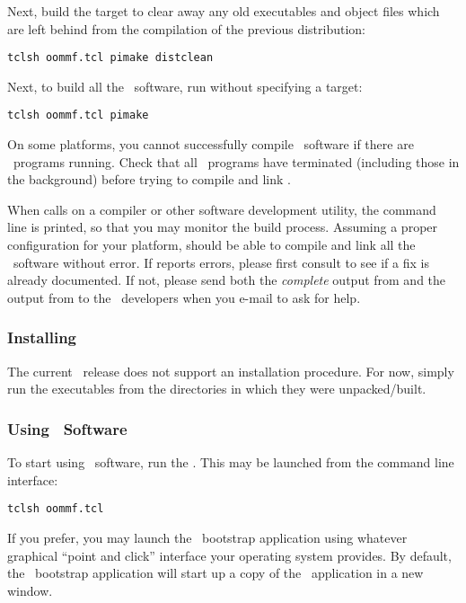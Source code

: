 Next, build the target  to clear away any old executables
and object files which are left behind from the compilation of the
previous distribution:
\begin{verbatim}
tclsh oommf.tcl pimake distclean
\end{verbatim}

Next, to build all the \OOMMF\ software, run  without
specifying a target:
\begin{verbatim}
tclsh oommf.tcl pimake
\end{verbatim}
On some platforms, you cannot successfully compile \OOMMF\ software if
there are \OOMMF\ programs running.  Check that all \OOMMF\ programs
have terminated (including those in the background) before trying to
compile and link \OOMMF.

When  calls on a compiler or other software development
utility, the command line is printed, so that you may monitor the build
process.  
Assuming a proper configuration for your platform,  should be
able to compile and link all the \OOMMF\ software without error.  If
 reports errors, please first consult 
to see if a fix is already documented.
If not, please send both the {\em complete} output 
from  and the output from 
to the \OOMMF\ developers when you e-mail to ask for help.

\subsubsection{Installing}

The current \OOMMF\ release does not support an installation procedure.
For now, simply run the executables from the directories in which they
were unpacked/built.

\subsubsection{Using \OOMMF\ Software}

To start using \OOMMF\ software, run the 
. This may be launched from the command
line interface:
\begin{verbatim}
tclsh oommf.tcl
\end{verbatim}

If you prefer, you may launch the \OOMMF\ bootstrap application
 using whatever graphical ``point and click''
interface your operating system provides.  By default, the \OOMMF\
bootstrap application will start up a copy of the \OOMMF\ application
\hyperrefhtml{\app{mmLaunch}}{\app{mmLaunch} (Sec.~}{)}{sec:mmlaunch} in a
new window.

